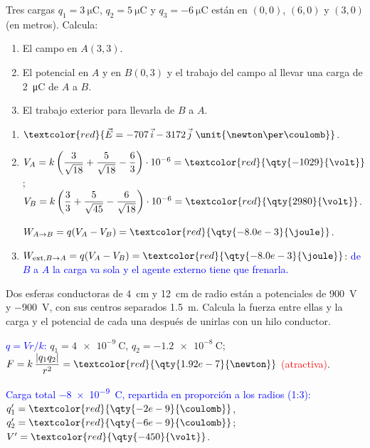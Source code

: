 \begin{exercise}
    Tres cargas \(q_1 = \qty{3}{\micro\coulomb}\), \(q_2 = \qty{5}{\micro\coulomb}\) y \(q_3 = \qty{-6}{\micro\coulomb}\) están en
    \((0, 0)\), \((6, 0)\) y \((3, 0)\) (en metros). Calcula:
    \begin{enumerate}[label=\letraminuscula]
        \item El campo en \(A(3, 3)\).
        \item El potencial en \(A\) y en \(B(0, 3)\) y el trabajo del campo al llevar una carga de \qty{2}{\micro\coulomb} de \(A\) a \(B\).
        \item El trabajo exterior para llevarla de \(B\) a \(A\).
    \end{enumerate}
    \begin{solu}
        \begin{enumerate}[label=\letraminuscula]
            \item \(\textcolor{red}{\vec E = -707\,\vec{i} - 3172\,\vec{j}\ \unit{\newton\per\coulomb}}\).
            \item \(V_A = k\left(\dfrac{3}{\sqrt{18}} + \dfrac{5}{\sqrt{18}} - \dfrac{6}{3}\right)\cdot 10^{-6} = \textcolor{red}{\qty{-1029}{\volt}}\);
            \(V_B = k\left(\dfrac{3}{3} + \dfrac{5}{\sqrt{45}} - \dfrac{6}{\sqrt{18}}\right)\cdot 10^{-6} = \textcolor{red}{\qty{2980}{\volt}}\).

            \(W_{A\to B} = q(V_A - V_B) = \textcolor{red}{\qty{-8.0e-3}{\joule}}\).
            \item \(W_{\text{ext},B\to A} = q(V_A - V_B) = \textcolor{red}{\qty{-8.0e-3}{\joule}}\): \textcolor{blue}{de \(B\) a \(A\) la carga va sola y el agente externo tiene que frenarla.}
        \end{enumerate}
    \end{solu}
\end{exercise}

\begin{exercise}
    Dos esferas conductoras de \qty{4}{\cm} y \qty{12}{\cm} de radio están a potenciales de \qty{900}{\volt} y \qty{-900}{\volt}, con
    sus centros separados \qty{1.5}{\m}. Calcula la fuerza entre ellas y la carga y el potencial de cada una después de unirlas
    con un hilo conductor.
    \begin{solu}
        \textcolor{blue}{\(q = Vr/k\):} \(q_1 = \qty{4e-9}{\coulomb}\), \(q_2 = \qty{-1.2e-8}{\coulomb}\);
        \(F = k\,\dfrac{|q_1 q_2|}{r^2} = \textcolor{red}{\qty{1.92e-7}{\newton}}\) \textcolor{red}{(atractiva)}.

        \textcolor{blue}{Carga total \qty{-8e-9}{\coulomb}, repartida en proporción a los radios (1:3):}
        \(q'_1 = \textcolor{red}{\qty{-2e-9}{\coulomb}}\), \(q'_2 = \textcolor{red}{\qty{-6e-9}{\coulomb}}\); \(V' = \textcolor{red}{\qty{-450}{\volt}}\).
    \end{solu}
\end{exercise}

